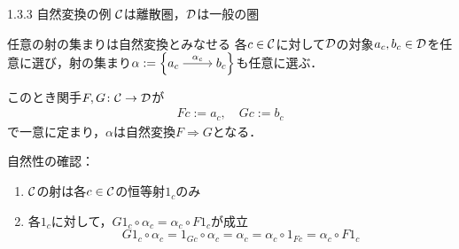 \documentclass[uplatex,a4paper,dvipdfmx,aspectratio=169,10pt]{beamer}
\begin{document}
\begin{frame}[fragile]{1.3.3 自然変換の例}
    $\mathcal{C}$は離散圏，$\mathcal{D}$は一般の圏
    \begin{exampleblock}{ 任意の射の集まりは自然変換とみなせる}
        各$c \in \mathcal{C}$に対して$\mathcal{D}$の対象$a_c, b_c \in \mathcal{D}$を任意に選び，射の集まり$\alpha := \left\{ \begin{tikzcd}[cramped] a_c \arrow[r, "\alpha_c"] & b_c \end{tikzcd}\right\}$も任意に選ぶ．

        このとき関手$F, G \colon \mathcal{C} \to \mathcal{D}$が
        \begin{align*}
            Fc := a_c, \quad Gc := b_c
        \end{align*}
        で一意に定まり，$\alpha$は自然変換$F \Rightarrow G$となる．
    \end{exampleblock}
    自然性の確認：
    \begin{enumerate}
        \item $\mathcal{C}$の射は各$c \in \mathcal{C}$の恒等射$1_c$のみ
        \item 各$1_c$に対して，$G 1_c \circ \alpha_c = \alpha_{c} \circ F 1_{c}$が成立
            \begin{equation*}
                G 1_c \circ \alpha_c = 1_{Gc} \circ \alpha_c = \alpha_c = \alpha_c \circ 1_{Fc} = \alpha_c \circ F 1_c
            \end{equation*}
    \end{enumerate}
\end{frame}
\end{document}
